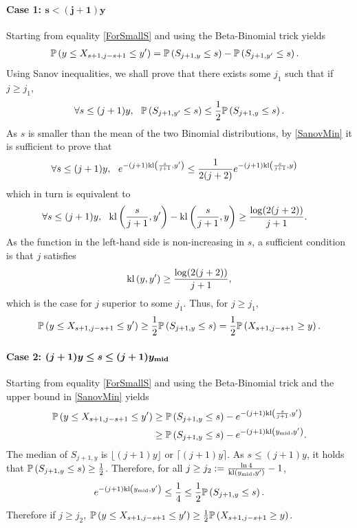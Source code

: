 \paragraph{Case 1: $\bm{s < (j+1)y}$} Starting from equality \eqref{ForSmallS} and using the Beta-Binomial trick yields  
\begin{align*}
&\mathbb{P}\left(y \leq X_{s+1,j-s+1} \leq y'\right) = \mathbb{P}\left(S_{j+1,y} \leq s\right) - \mathbb{P}\left(S_{j+1,y'} \leq s\right).
\end{align*}
Using Sanov inequalities, we shall prove that there exists some $j_1$ such that if $j\geq j_1$, 
\[\forall s \leq (j+1)y, \ \ \bP\left(S_{j+1,y'} \leq s\right) \leq \frac{1}{2}\bP\left(S_{j+1,y} \leq s\right).\]
As $s$ is smaller than the mean of the two Binomial distributions, by \eqref{SanovMin} it is sufficient to prove that 
\begin{align*}
&\forall s \leq (j+1)y,
\ \ e^{-(j+1)\mathrm{kl}\left(\frac{s}{j+1} , y'\right)} \leq \frac{1}{2(j+2)}e^{-(j+1)\mathrm{kl}\left(\frac{s}{j+1} , y\right)}
\end{align*}
which in turn is equivalent to 
\begin{align*}
&\forall s \leq (j+1)y,
\ \ \mathrm{kl}\left(\frac{s}{j+1} , y'\right)  -  \mathrm{kl}\left(\frac{s}{j+1} , y\right) \geq \frac{\log(2(j+2))}{j+1}.
\end{align*}
As the function in the left-hand side is non-increasing in $s$, a sufficient condition is that $j$ satisfies 
\[ \mathrm{kl}\left(y , y'\right)\geq \frac{\log(2(j+2))}{j+1},\]
which is the case for $j$ superior to some $j_1$. Thus, for $j\geq j_1$, 
\begin{align*}
\mathbb{P}\left(y \leq X_{s+1,j-s+1} \leq y'\right)\geq \frac{1}{2}\mathbb{P}\left(S_{j+1,y} \leq s\right)= \frac{1}{2}\mathbb{P}\left(X_{s+1,j-s+1} \geq y\right).
\end{align*}

\paragraph{Case 2: $\bm{(j+1)y \leq s \leq (j+1)y_{\mathrm{mid}}}$} Starting from equality \eqref{ForSmallS} and using the Beta-Binomial trick and the upper bound in \eqref{SanovMin} yields 
\begin{align*}
\mathbb{P}\left(y \leq X_{s+1,j-s+1} \leq y'\right) 
 & \geq \mathbb{P}\left(S_{j+1,y} \leq s\right) - e^{-(j+1)\mathrm{kl}\left(\frac{s}{j+1} , y'\right)}
\\ & \geq \mathbb{P}\left(S_{j+1,y} \leq s\right) - e^{-(j+1)\mathrm{kl}\left(y_{\mathrm{mid}} , y'\right)}. 
\end{align*}
The median of $S_{j+1,y}$ is $\lfloor(j+1)y\rfloor$ or $\lceil(j+1)y\rceil$. As $s \leq  (j+1)y$, it holds that $\mathbb{P}\left(S_{j+1,y} \leq s\right) \geq \frac{1}{2}$. Therefore, for all $j \geq j_2 := \frac{\ln 4}{\mathrm{kl}(y_{\mathrm{mid}},y')}-1$, 
\[e^{-(j+1)\mathrm{kl}\left(y_{\mathrm{mid}} , y'\right)} \leq \frac{1}{4} \leq \frac{1}{2}\mathbb{P}\left(S_{j+1,y} \leq s\right).\]
Therefore if $j \geq j_2$, $\mathbb{P}\left(y \leq X_{s+1,j-s+1} \leq y'\right)  \geq \frac{1}{2}\mathbb{P}\left(X_{s+1,j-s+1} \geq y\right)$.

